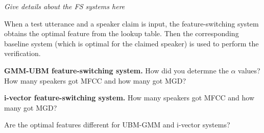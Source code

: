 \documentclass{article}
\begin{document}
\textit{Give details about the FS systems here}

When a test utterance and a speaker claim is input, the feature-switching system
obtains the optimal feature from the lookup table. Then the corresponding
baseline system (which is optimal for the claimed speaker) is used to perform the verification.

\textbf{GMM-UBM feature-switching system.}
How did you determne the $\alpha$ values?
How many speakers got MFCC and how many got MGD?

\textbf{i-vector feature-switching system.}
How many speakers got MFCC and how many got MGD?

Are the optimal features different for UBM-GMM and i-vector systems?
















\end{document}
